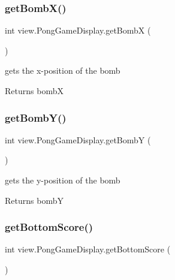 \subsubsection{\texorpdfstring{get\+Bomb\+X()}{getBombX()}}
{\footnotesize\ttfamily int view.\+Pong\+Game\+Display.\+get\+BombX (\begin{DoxyParamCaption}{ }\end{DoxyParamCaption})}



gets the x-\/position of the bomb 

\begin{DoxyReturn}{Returns}
bombX 
\end{DoxyReturn}
\hypertarget{classview_1_1_pong_game_display_a6a8f4aa57bd1601d8a1d51eb767f0b2a}{}\label{classview_1_1_pong_game_display_a6a8f4aa57bd1601d8a1d51eb767f0b2a} 
\subsubsection{\texorpdfstring{get\+Bomb\+Y()}{getBombY()}}
{\footnotesize\ttfamily int view.\+Pong\+Game\+Display.\+get\+BombY (\begin{DoxyParamCaption}{ }\end{DoxyParamCaption})}



gets the y-\/position of the bomb 

\begin{DoxyReturn}{Returns}
bombY 
\end{DoxyReturn}
\hypertarget{classview_1_1_pong_game_display_a11b19810a46fa40aa6913ccaf7a8e2ff}{}\label{classview_1_1_pong_game_display_a11b19810a46fa40aa6913ccaf7a8e2ff} 
\subsubsection{\texorpdfstring{get\+Bottom\+Score()}{getBottomScore()}}
{\footnotesize\ttfamily int view.\+Pong\+Game\+Display.\+get\+Bottom\+Score (\begin{DoxyParamCaption}{ }\end{DoxyParamCaption})}



